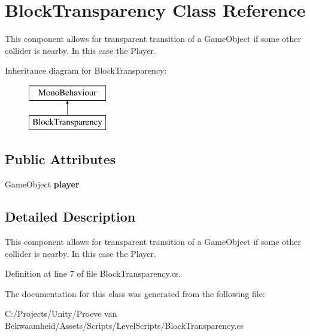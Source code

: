 \hypertarget{class_block_transparency}{\section{Block\+Transparency Class Reference}
\label{class_block_transparency}
}


This component allows for transparent transition of a Game\+Object if some other collider is nearby. In this case the Player.  


Inheritance diagram for Block\+Transparency\+:\begin{figure}[H]
\begin{center}
\leavevmode
\includegraphics[height=2.000000cm]{class_block_transparency}
\end{center}
\end{figure}
\subsection*{Public Attributes}
\begin{DoxyCompactItemize}
\item 
\hypertarget{class_block_transparency_a7c5f9720e40e90ec89cd73ef14ee6623}{Game\+Object {\bfseries player}}\label{class_block_transparency_a7c5f9720e40e90ec89cd73ef14ee6623}

\end{DoxyCompactItemize}


\subsection{Detailed Description}
This component allows for transparent transition of a Game\+Object if some other collider is nearby. In this case the Player. 



Definition at line 7 of file Block\+Transparency.\+cs.



The documentation for this class was generated from the following file\+:\begin{DoxyCompactItemize}
\item 
C\+:/\+Projects/\+Unity/\+Proeve van Bekwaamheid/\+Assets/\+Scripts/\+Level\+Scripts/Block\+Transparency.\+cs\end{DoxyCompactItemize}
